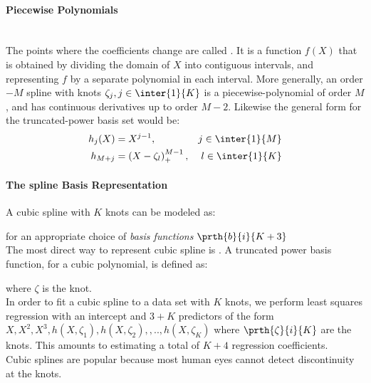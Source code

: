\paragraph{Piecewise Polynomials}
\\
The points where the coefficients change are called .
It is a function $f(X)$ that is obtained by dividing the domain of $X$ into contiguous intervals,
and representing $f$ by a separate polynomial in each interval.
More generally, an order$-M$ spline with knots $\zeta_{j}, j\in\inter{1}{K}$ is a 
piecewise-polynomial of order $M$, and has continuous derivatives up to order $M-2$.
Likewise the general form for the truncated-power basis set would be:
\begin{align*}
h_{j}(X) &= X^{j-1}, &j\in\inter{1}{M}\\
h_{M+j} &=\left(X-\zeta_{l}\right)_{+}^{M-1}, &l\in\inter{1}{K}
\end{align*}


\paragraph{The spline Basis Representation}
A cubic spline with $K$ knots can be modeled as:
\begin{center}
\end{center}
for an appropriate choice of \emph{basis functions} $\prth{b}{i}{K+3}$\\
The most direct way to represent cubic spline is .
A truncated power basis function, for a cubic polynomial, is defined as:
\begin{center}
\end{center}
where $\zeta$ is the knot.\\
In order to fit a cubic spline to a data set with $K$ knots, we perform
least squares regression with an intercept and $3+K$ predictors of the
form $X, X^{2}, X^{3}, h\left(X,\zeta_{1}\right), h\left(X,\zeta_{2}\right),,..,h\left(X,\zeta_{K}\right)$ where $\prth{\zeta}{i}{K}$ are the
knots. This amounts to estimating a total of $K+4$ regression 
coefficients.\\
Cubic splines are popular because most human eyes cannot detect 
discontinuity at the knots.

